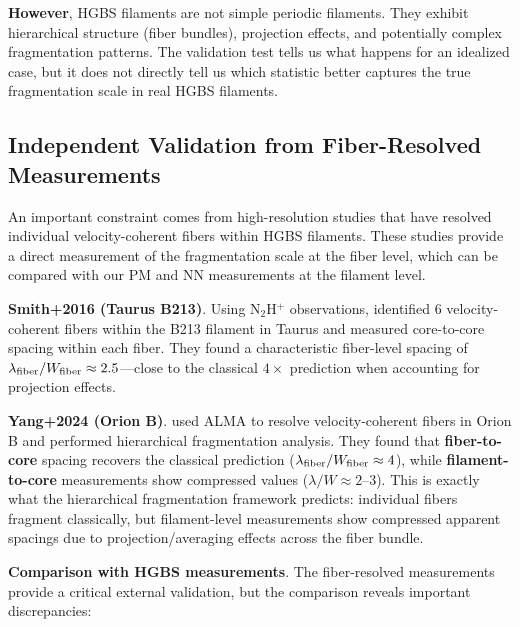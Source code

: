 \documentclass[twoside,twocolumn]{mnras}
\begin{document}
\textbf{However}, HGBS filaments are not simple periodic filaments. They exhibit hierarchical structure (fiber bundles), projection effects, and potentially complex fragmentation patterns. The validation test tells us what happens for an idealized case, but it does not directly tell us which statistic better captures the true fragmentation scale in real HGBS filaments.

\subsection{Independent Validation from Fiber-Resolved Measurements}

An important constraint comes from high-resolution studies that have resolved individual velocity-coherent fibers within HGBS filaments. These studies provide a direct measurement of the fragmentation scale at the fiber level, which can be compared with our PM and NN measurements at the filament level.

\textbf{Smith+2016 (Taurus B213)}. Using N$_2$H$^+$ observations, \citet{Smith2016} identified 6 velocity-coherent fibers within the B213 filament in Taurus and measured core-to-core spacing within each fiber. They found a characteristic fiber-level spacing of $\lambda_{\rm fiber}/W_{\rm fiber} \approx 2.5$---close to the classical $4\times$ prediction when accounting for projection effects.

\textbf{Yang+2024 (Orion B)}. \citet{Yang2024} used ALMA to resolve velocity-coherent fibers in Orion B and performed hierarchical fragmentation analysis. They found that \textbf{fiber-to-core} spacing recovers the classical prediction ($\lambda_{\rm fiber}/W_{\rm fiber} \approx 4$), while \textbf{filament-to-core} measurements show compressed values ($\lambda/W \approx 2$--$3$). This is exactly what the hierarchical fragmentation framework predicts: individual fibers fragment classically, but filament-level measurements show compressed apparent spacings due to projection/averaging effects across the fiber bundle.

\textbf{Comparison with HGBS measurements}. The fiber-resolved measurements provide a critical external validation, but the comparison reveals important discrepancies:
\end{document}
